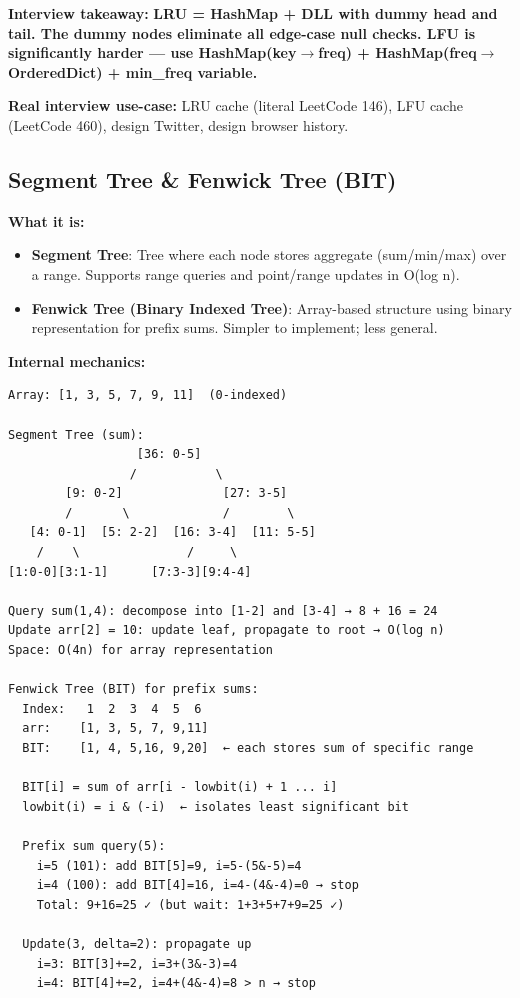 \documentclass[11pt]{article}
\providecommand{\tightlist}{\setlength{\itemsep}{1pt}\setlength{\parskip}{0pt}}
\begin{document}
\textbf{Interview takeaway:} \textbf{LRU = HashMap + DLL with dummy head and tail. The dummy nodes eliminate all edge-case null checks. LFU is significantly harder --- use HashMap(key\(\rightarrow\)freq) + HashMap(freq\(\rightarrow\)OrderedDict) + min\_freq variable.}

\textbf{Real interview use-case:} LRU cache (literal LeetCode 146), LFU cache (LeetCode 460), design Twitter, design browser history.

\subsection{Segment Tree \& Fenwick Tree (BIT)}\label{segment-tree--fenwick-tree-bit}

\textbf{What it is:}

\begin{itemize}
\tightlist
\item
  \textbf{Segment Tree}: Tree where each node stores aggregate (sum/min/max) over a range. Supports range queries and point/range updates in O(log n).
\item
  \textbf{Fenwick Tree (Binary Indexed Tree)}: Array-based structure using binary representation for prefix sums. Simpler to implement; less general.
\end{itemize}

\textbf{Internal mechanics:}

\setcodelang{}

\begin{verbatim}
Array: [1, 3, 5, 7, 9, 11]  (0-indexed)

Segment Tree (sum):
                  [36: 0-5]
                 /           \
        [9: 0-2]              [27: 3-5]
        /       \             /        \
   [4: 0-1]  [5: 2-2]  [16: 3-4]  [11: 5-5]
    /    \               /     \
[1:0-0][3:1-1]      [7:3-3][9:4-4]

Query sum(1,4): decompose into [1-2] and [3-4] → 8 + 16 = 24
Update arr[2] = 10: update leaf, propagate to root → O(log n)
Space: O(4n) for array representation

Fenwick Tree (BIT) for prefix sums:
  Index:   1  2  3  4  5  6
  arr:    [1, 3, 5, 7, 9,11]
  BIT:    [1, 4, 5,16, 9,20]  ← each stores sum of specific range

  BIT[i] = sum of arr[i - lowbit(i) + 1 ... i]
  lowbit(i) = i & (-i)  ← isolates least significant bit

  Prefix sum query(5):
    i=5 (101): add BIT[5]=9, i=5-(5&-5)=4
    i=4 (100): add BIT[4]=16, i=4-(4&-4)=0 → stop
    Total: 9+16=25 ✓ (but wait: 1+3+5+7+9=25 ✓)

  Update(3, delta=2): propagate up
    i=3: BIT[3]+=2, i=3+(3&-3)=4
    i=4: BIT[4]+=2, i=4+(4&-4)=8 > n → stop
\end{verbatim}
\end{document}
